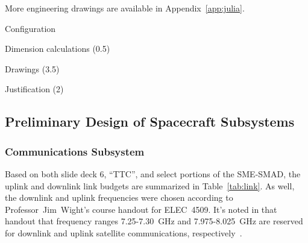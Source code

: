 \documentclass[9pt]{article}
\begin{document}
More engineering drawings are available in Appendix~\ref{app:julia}.

Configuration

Dimension calculations (0.5)

Drawings (3.5)

Justification (2)


\subsection{Preliminary Design of Spacecraft Subsystems}


\subsubsection{Communications Subsystem}
Based on both slide deck 6, ``TTC'', and select portions of the SME-SMAD, the uplink and downlink link budgets are summarized in Table~\ref{tab:link}.
As well, the downlink and uplink frequencies were chosen according to Professor~Jim~Wight's course handout for ELEC~4509.
It's noted in that handout that frequency ranges 7.25-7.30~GHz and 7.975-8.025~GHz are reserved for downlink and uplink satellite communications, respectively~\cite[II, p. 3]{commlinks}.
\end{document}
